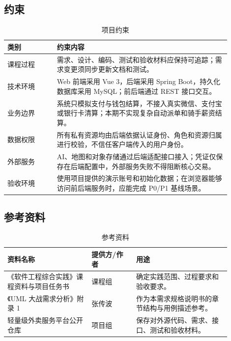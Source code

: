 \subsection{约束}

\begin{longtable}{|L{0.20\linewidth}|L{0.70\linewidth}|}
\caption{项目约束}\label{tab:constraints}\\ \hline
\textbf{类别} & \textbf{约束内容} \\ \hline
课程过程 & 需求、设计、编码、测试和验收材料应保持可追踪；需求变更须同步更新文档和测试。 \\ \hline
技术环境 & Web 前端采用 Vue 3，后端采用 Spring Boot，持久化数据库采用 MySQL；前后端通过 REST 接口交互。 \\ \hline
业务边界 & 系统只模拟支付与钱包结算，不接入真实微信、支付宝或银行卡清算；本期不实现复杂自动派单和骑手薪资结算。 \\ \hline
数据权限 & 所有私有资源均由后端依据认证身份、角色和资源归属进行校验，不信任客户端传入的用户身份。 \\ \hline
外部服务 & AI、地图和对象存储通过后端适配接口接入；凭证仅保存在后端配置中，外部服务失败不得阻断核心交易。 \\ \hline
验收环境 & 使用项目提供的演示账号和初始化数据；在浏览器能够访问前后端服务时，应能完成 P0/P1 基线场景。 \\ \hline
\end{longtable}

\subsection{参考资料}

\begin{longtable}{|L{0.34\linewidth}|L{0.18\linewidth}|L{0.38\linewidth}|}
\caption{参考资料}\label{tab:references}\\ \hline
\textbf{资料名称} & \textbf{提供方/作者} & \textbf{用途} \\ \hline
《软件工程综合实践》课程资料与项目任务书 & 课程组 & 确定实践范围、过程要求和验收要求。 \\ \hline
《UML 大战需求分析》附录 1 & 张传波 & 作为本需求规格说明书的章节结构与用例描述参考。 \\ \hline
轻量级外卖服务平台公开仓库 & 项目组 & 保存对外源代码、需求、接口、测试和验收材料。 \\ \hline
\end{longtable}
